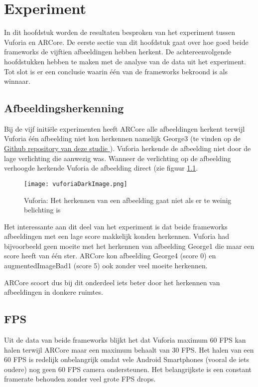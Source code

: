 \chapter{Experiment}
\label{ch:experiment}

In dit hoofdstuk worden de resultaten besproken van het experiment tussen Vuforia en ARCore. De eerste sectie van dit hoofdstuk gaat over hoe goed beide frameworks de vijftien afbeeldingen hebben herkent. De achtereenvolgende hoofdstukken hebben te maken met de analyse van de data uit het experiment. Tot slot is er een conclusie waarin één van de frameworks bekroond is als winnaar.

\section{Afbeeldingsherkenning}
Bij de vijf initiële experimenten heeft ARCore alle afbeeldingen herkent terwijl Vuforia één afbeelding niet kon herkennen namelijk George3 (te vinden op de \href{https://github.com/MatthiasDeFre/bachelorproef-hogent-2019}{Github repository van deze studie \autocite{GITHUBMDF}}). Vuforia herkende de afbeelding niet door de lage verlichting die aanwezig was. Wanneer de verlichting op de afbeelding verhoogde herkende Vuforia de afbeelding direct (zie figuur \ref{fig:vuforiaDarkImage}.

\begin{figure}
    \texttt{[image: vuforiaDarkImage.png]}
    \caption{Vuforia: Het herkennen van een afbeelding gaat niet als er te weinig belichting is}
    \label{fig:vuforiaDarkImage}
\end{figure}


Het interessante aan dit deel van het experiment is dat beide frameworks afbeeldingen met een lage score makkelijk konden herkennen. Vuforia had bijvoorbeeld geen moeite met het herkennen van afbeelding George1 die maar een score heeft van één ster. ARCore kon afbeelding George4 (score 0) en augmentedImageBad1 (score 5) ook zonder veel moeite herkennen.

ARCore scoort dus bij dit onderdeel iets beter door het herkennen van afbeeldingen in donkere ruimtes.

\section{FPS}\label{sec:fps}

Uit de data van beide frameworks blijkt het dat Vuforia maximum 60 FPS kan halen terwijl ARCore maar een maximum behaalt van 30 FPS. Het halen van een 60 FPS is redelijk onbelangrijk omdat vele Android Smartphones (vooral de iets oudere) nog geen 60 FPS camera ondersteunen. Het belangrijkste is een constant framerate behouden zonder veel grote FPS drops.


